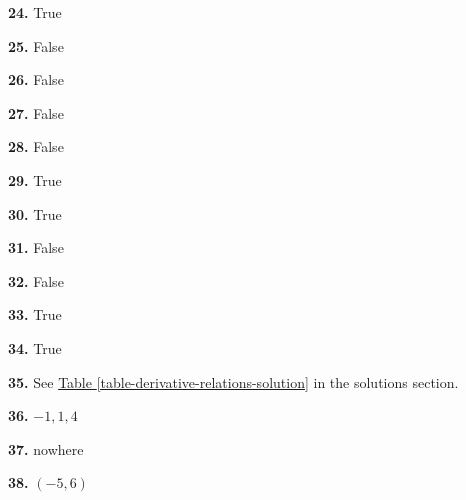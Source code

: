 \documentclass[12pt,]{book}
\theoremstyle{plain}
\theoremstyle{definition}
\numberwithin{equation}{section}
\newcommand{\ointerval}[2]{\left(#1,#2\right)}
\begin{document}
                \par\smallskip
\noindent\textbf{24.}\quad{}
                    True%
 
                \par\smallskip
\noindent\textbf{25.}\quad{}
                    False%
 
                \par\smallskip
\noindent\textbf{26.}\quad{}
                    False%
 
                \par\smallskip
\noindent\textbf{27.}\quad{}
                    False%

                \par\smallskip
\noindent\textbf{28.}\quad{}
                    False%

                \par\smallskip
\noindent\textbf{29.}\quad{}
                    True%

                \par\smallskip
\noindent\textbf{30.}\quad{}
                    True%

                \par\smallskip
\noindent\textbf{31.}\quad{}
                    False%

                \par\smallskip
\noindent\textbf{32.}\quad{}
                    False%

                \par\smallskip
\noindent\textbf{33.}\quad{}
                    True%

                \par\smallskip
\noindent\textbf{34.}\quad{}
                    True%

                \par\smallskip
\noindent\textbf{35.}\quad{}
                See \hyperref[table-derivative-relations-solution]{Table \ref{table-derivative-relations-solution}} in the solutions section.%

            \par\smallskip
\noindent\textbf{36.}\quad{}
                    \(-1,1,4\)%

                \par\smallskip
\noindent\textbf{37.}\quad{}
                    nowhere%

                \par\smallskip
\noindent\textbf{38.}\quad{}
                    \(\ointerval{-5}{6}\)%
\end{document}
